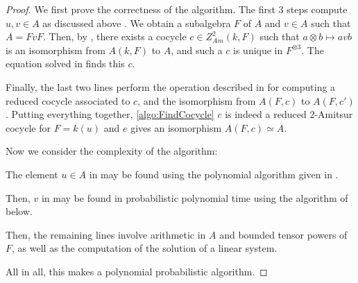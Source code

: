     \begin{proof}
         We first prove the correctness of the algorithm. The first 3 steps compute \(u,v \in A\) as discussed above . We obtain a subalgebra \(F\) of \(A\) and \(v \in A\) such that \(A = FvF\). Then, by , there exists a cocycle \(c \in Z_{Am}^2(k,F)\) such that \(a \otimes b \mapsto avb\) is an isomorphism from \(A(k,F)\) to \(A\), and such a \(c\) is unique in \(F^{\otimes 3}\). The equation solved in  finds this \(c\).

        Finally, the last two lines perform the operation described in  for computing a reduced cocycle associated to \(c\), and the isomorphism from \(A(F,c)\) to \(A(F,c')\). Putting everything together, \cref{algo:FindCocycle} \(c\) is indeed a reduced \(2\)-Amitsur cocycle for \(F = k(u)\) and \(e\) gives an isomorphism \(A(F,c) \simeq A\).

        Now we consider the complexity of the algorithm:
        
        The element \(u \in A\) in  may be found using the polynomial algorithm given in \cite{graaf2000finding}.

        Then, \(v\) in  may be found in probabilistic polynomial time using the algorithm of  below.

        Then, the remaining lines involve arithmetic in \(A\) and bounded tensor powers of \(F\), as well as the computation of the solution of a linear system.
        
        All in all, this makes  a polynomial probabilistic algorithm.
    \end{proof}
